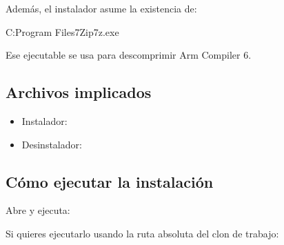 \documentclass[letterpaper,10pt,english]{sphinxmanual}
\begin{document}
\sphinxAtStartPar
Además, el instalador asume la existencia de:

\begin{sphinxVerbatim}[commandchars=\\\{\}]
C:\PYGZbs{}Program Files\PYGZbs{}7\PYGZhy{}Zip\PYGZbs{}7z.exe
\end{sphinxVerbatim}

\sphinxAtStartPar
Ese ejecutable se usa para descomprimir Arm Compiler 6.


\subsection{Archivos implicados}
\label{\detokenize{vscode:id1}}\begin{itemize}
\item {} 
\sphinxAtStartPar
Instalador: 

\item {} 
\sphinxAtStartPar
Desinstalador: 

\end{itemize}


\subsection{Cómo ejecutar la instalación}
\label{\detokenize{vscode:id2}}
\sphinxAtStartPar
Abre  y ejecuta:

\begin{sphinxVerbatim}[commandchars=\\\{\}]
    
\end{sphinxVerbatim}

\sphinxAtStartPar
Si quieres ejecutarlo usando la ruta absoluta del clon de trabajo:

\begin{sphinxVerbatim}[commandchars=\\\{\}]
    
 
\end{sphinxVerbatim}
\end{document}
